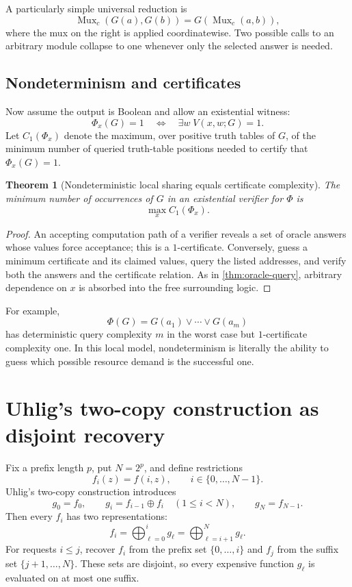 \documentclass[11pt]{article}
\newtheorem{theorem}{Theorem}[section]
\theoremstyle{definition}
\newcommand{\Mux}{\operatorname{Mux}}
\newcommand{\xor}{\mathbin{\oplus}}
\newcommand{\bigxor}{\bigoplus}
\begin{document}
A particularly simple universal reduction is
\[
 \Mux_c(G(a),G(b))=G(\Mux_c(a,b)),
\]
where the mux on the right is applied coordinatewise.  Two possible calls to an arbitrary module collapse to one whenever only the selected answer is needed.

\subsection{Nondeterminism and certificates}

Now assume the output is Boolean and allow an existential witness:
\[
 \Phi_x(G)=1
 \quad\Longleftrightarrow\quad
 \exists w\;V(x,w;G)=1.
\]
Let $C_1(\Phi_x)$ denote the maximum, over positive truth tables of $G$, of the minimum number of queried truth-table positions needed to certify that $\Phi_x(G)=1$.

\begin{theorem}[Nondeterministic local sharing equals certificate complexity]\label{thm:oracle-cert}
The minimum number of occurrences of $G$ in an existential verifier for $\Phi$ is
\[
  \max_x C_1(\Phi_x).
\]
\end{theorem}

\begin{proof}
An accepting computation path of a verifier reveals a set of oracle answers whose values force acceptance; this is a $1$-certificate.  Conversely, guess a minimum certificate and its claimed values, query the listed addresses, and verify both the answers and the certificate relation.  As in \cref{thm:oracle-query}, arbitrary dependence on $x$ is absorbed into the free surrounding logic.
\end{proof}

For example,
\[
 \Phi(G)=G(a_1)\vee\cdots\vee G(a_m)
\]
has deterministic query complexity $m$ in the worst case but $1$-certificate complexity one.  In this local model, nondeterminism is literally the ability to guess which possible resource demand is the successful one.

\section{Uhlig's two-copy construction as disjoint recovery}

Fix a prefix length $p$, put $N=2^p$, and define restrictions
\[
 f_i(z)=f(i,z),\qquad i\in\{0,\ldots,N-1\}.
\]
Uhlig's two-copy construction introduces
\[
 g_0=f_0,\qquad
 g_i=f_{i-1}\xor f_i\quad(1\le i<N),\qquad
 g_N=f_{N-1}.
\]
Then every $f_i$ has two representations:
\[
 f_i=\bigxor_{\ell=0}^{i}g_\ell
     =\bigxor_{\ell=i+1}^{N}g_\ell.
\]
For requests $i\le j$, recover $f_i$ from the prefix set
$\{0,\ldots,i\}$ and $f_j$ from the suffix set
$\{j+1,\ldots,N\}$.  These sets are disjoint, so every expensive function $g_\ell$ is evaluated on at most one suffix.
\end{document}
